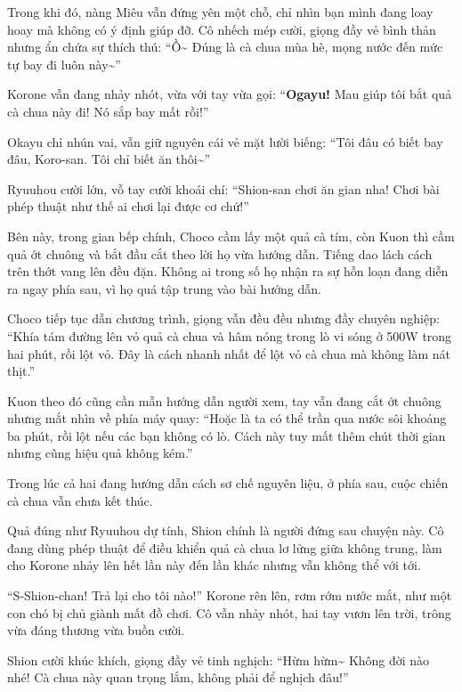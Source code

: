 \documentclass[../main.tex]{subfiles}
\begin{document}
Trong khi đó, nàng Miêu vẫn đứng yên một chỗ, chỉ nhìn bạn mình đang loay hoay mà không có ý định giúp đỡ. Cô nhếch mép cười, giọng đầy vẻ bình thản nhưng ẩn chứa sự thích thú: ``Ồ\~{} Đúng là cà chua mùa hè, mọng nước đến mức tự bay đi luôn này\~{}''

Korone vẫn đang nhảy nhót, vừa với tay vừa gọi: ``\textbf{Ogayu!} Mau giúp tôi bắt quả cà chua này đi! Nó sắp bay mất rồi!''

Okayu chỉ nhún vai, vẫn giữ nguyên cái vẻ mặt lười biếng: ``Tôi đâu có biết bay đâu, Koro-san. Tôi chỉ biết ăn thôi\~{}''

Ryuuhou cười lớn, vỗ tay cười khoái chí: ``Shion-san chơi ăn gian nha! Chơi bài phép thuật như thế ai chơi lại được cơ chứ!''

Bên này, trong gian bếp chính, Choco cầm lấy một quả cà tím, còn Kuon thì cầm quả ớt chuông và bắt đầu cắt theo lời họ vừa hướng dẫn. Tiếng dao lách cách trên thớt vang lên đều đặn. Không ai trong số họ nhận ra sự hỗn loạn đang diễn ra ngay phía sau, vì họ quá tập trung vào bài hướng dẫn.

\ct

Choco tiếp tục dẫn chương trình, giọng vẫn đều đều nhưng đầy chuyên nghiệp: ``Khía tám đường lên vỏ quả cà chua và hâm nóng trong lò vi sóng ở 500W trong hai phút, rồi lột vỏ. Đây là cách nhanh nhất để lột vỏ cà chua mà không làm nát thịt.''

Kuon theo đó cũng cần mẫn hướng dẫn người xem, tay vẫn đang cắt ớt chuông nhưng mắt nhìn về phía máy quay: ``Hoặc là ta có thể trần qua nước sôi khoảng ba phút, rồi lột nếu các bạn không có lò. Cách này tuy mất thêm chút thời gian nhưng cũng hiệu quả không kém.''

Trong lúc cả hai đang hướng dẫn cách sơ chế nguyên liệu, ở phía sau, cuộc chiến cà chua vẫn chưa kết thúc.

Quả đúng như Ryuuhou dự tính, Shion chính là người đứng sau chuyện này. Cô đang dùng phép thuật để điều khiển quả cà chua lơ lửng giữa không trung, làm cho Korone nhảy lên hết lần này đến lần khác nhưng vẫn không thể với tới.


``S-Shion-chan! Trả lại cho tôi nào!'' Korone rên lên, rơm rớm nước mắt, như một con chó bị chủ giành mất đồ chơi. Cô vẫn nhảy nhót, hai tay vươn lên trời, trông vừa đáng thương vừa buồn cười.

Shion cười khúc khích, giọng đầy vẻ tinh nghịch: ``Hừm hừm\~{} Không đời nào nhé! Cà chua này quan trọng lắm, không phải để nghịch đâu!''
\end{document}
